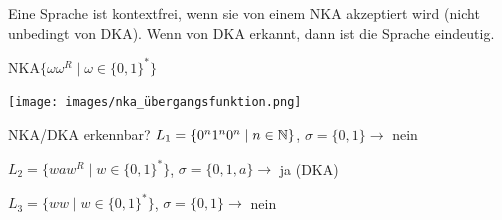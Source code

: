 \begin{remark}
    Eine Sprache ist kontextfrei, wenn sie von einem NKA akzeptiert wird (nicht unbedingt von DKA).
    Wenn von DKA erkannt, dann ist die Sprache eindeutig.
\end{remark}

\begin{minipage}{0.4\linewidth}
    \begin{concept}{NKA}$\{\omega \omega^{R} \mid \omega \in\{0,1\}^{*}\}$
    \end{concept}
\end{minipage}
\begin{minipage}{0.6\linewidth}
        \texttt{[image: images/nka\_übergangsfunktion.png]}
\end{minipage}


\begin{example2}{NKA/DKA erkennbar?}
    $L_1 = \{0^n1^n0^n \mid n \in \mathbb{N}\}$, $\sigma = \{0,1\} \rightarrow$ nein

    $L_2 = \{waw^R \mid w \in \{0,1\}^*\}$, $\sigma = \{0,1,a\} \rightarrow$ ja (DKA)

    $L_3 = \{ww \mid w \in \{0,1\}^*\}$, $\sigma = \{0,1\} \rightarrow$ nein
\end{example2}

